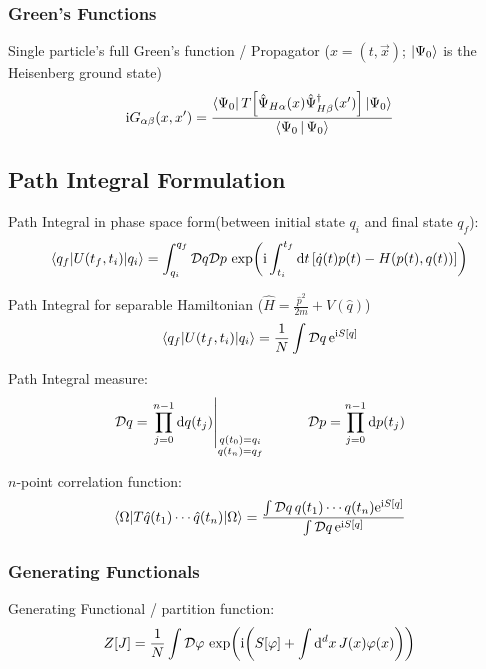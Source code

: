 		\subsubsection{Green's Functions}
			Single particle's full Green's function / Propagator  ($x=(t,\vec{x})$; $\Ket{\Psi_0}$ is the Heisenberg ground state)
			\begin{equation}
				\begin{aligned}
					\mathrm{i} G_{\alpha\beta}(x, x') &= \frac{\Bra{\Psi_0} T\qty[\hat{\Psi}_{H\alpha}(x)\hat{\Psi}^\dagger_{H\beta}(x')] \Ket{\Psi_0}}{\Braket{\Psi_0|\Psi_0}} \\
				\end{aligned}
			\end{equation}


	\subsection{Path Integral Formulation}
		Path Integral in phase space form(between initial state $q_i$ and final state $q_f$):
		\begin{equation}
			\mel**{q_f}{U(t_f, t_i)}{q_i} = \int_{q_i}^{q_f} \mathcal{D}q \mathcal{D}p \, \exp(\mathrm{i} \int_{t_i}^{t_f} \dd t \, \qty[ \dot{q}(t)p(t) - H\qty(p(t),q(t))])
		\end{equation}

		\noindent
		Path Integral for separable Hamiltonian (\ie $\hat{H} = \frac{\hat{p}^2}{2m} + V(\hat{q})$)
		\begin{equation}
			\mel**{q_f}{U(t_f, t_i)}{q_i} = \frac{1}{N} \int \mathcal{D}q \, \mathrm{e}^{\mathrm{i} S[q]}
		\end{equation}

		\noindent
		Path Integral measure:
		\begin{equation}
			\mathcal{D}q = \eval{\prod_{j=0}^{n-1} \dd q(t_j)}_{\substack{q(t_0)=q_i\\q(t_n)=q_f}}
			\hsp
			\mathcal{D}p = \prod_{j=0}^{n-1} \dd p(t_j)
		\end{equation}

		\noindent
		$n$-point correlation function:
		\begin{equation}
			\mel**{\Omega}{T\hat{q}(t_1)\dotsb\hat{q}(t_n)}{\Omega} = \frac{\int\mathcal{D}q\,q(t_1)\dotsb q(t_n)\mathrm{e}^{\mathrm{i} S \qty[q]}}{\int\mathcal{D}q\,\mathrm{e}^{\mathrm{i} S\qty[q]}}
		\end{equation}

		\subsubsection{Generating Functionals}
			Generating Functional / partition function:
			\begin{equation}
				Z[J] = \frac{1}{N} \int \mathcal{D}\varphi\, \exp(\mathrm{i}\qty(S[\varphi] + \int \dd^d x \, J(x) \varphi(x)))
			\end{equation}

